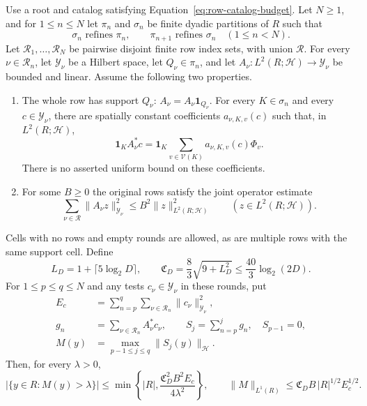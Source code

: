 \begin{lemma}
\label{lem:row-maximal}
Use a root and catalog satisfying
Equation~\eqref{eq:row-catalog-budget}.  Let $N\ge1$, and for
$1\le n\le N$ let $\pi_n$ and $\sigma_n$ be finite dyadic partitions
of $R$ such that
\[
 \sigma_n\text{ refines }\pi_n,\qquad
 \pi_{n+1}\text{ refines }\sigma_n\quad(1\le n<N).
\]
Let $\mathcal R_1,\ldots,\mathcal R_N$ be pairwise disjoint finite
row index sets, with union $\mathcal R$.  For every
$\nu\in\mathcal R_n$, let $\mathcal Y_\nu$ be a Hilbert space,
let $Q_\nu\in\pi_n$, and let
$A_\nu:L^2(R;\mathcal H)\to\mathcal Y_\nu$ be bounded and linear.
Assume the following two properties.
\begin{enumerate}
\item The whole row has support $Q_\nu$:
      $A_\nu=A_\nu\mathbf1_{Q_\nu}$.  For every $K\in\sigma_n$
      and every $c\in\mathcal Y_\nu$, there are spatially constant
      coefficients $a_{\nu,K,v}(c)$ such that, in $L^2(R;\mathcal H)$,
      \[
       \mathbf1_K A_\nu^*c
       =\mathbf1_K\sum_{v\in\mathcal V(K)}
                        a_{\nu,K,v}(c)\Phi_v.
      \]
      There is no asserted uniform bound on these coefficients.
\item For some $B\ge0$ the original rows satisfy the joint operator
      estimate
      \[
       \sum_{\nu\in\mathcal R}\|A_\nu z\|_{\mathcal Y_\nu}^2
       \le B^2\|z\|_{L^2(R;\mathcal H)}^2
       \qquad(z\in L^2(R;\mathcal H)).
      \]
\end{enumerate}
Cells with no rows and empty rounds are allowed, as are multiple rows with
the same support cell.  Define
\[
 L_D=1+\lceil5\log_2D\rceil,\qquad
 \mathfrak C_D=\frac83\sqrt{9+L_D^2}
 \le \frac{40}{3}\log_2(2D).
\]
For $1\le p\le q\le N$ and any tests
$c_\nu\in\mathcal Y_\nu$ in these rounds, put
\[
 \begin{split}
 E_c&=\sum_{n=p}^q\sum_{\nu\in\mathcal R_n}\|c_\nu\|_{\mathcal Y_\nu}^2,\\
 g_n&=\sum_{\nu\in\mathcal R_n}A_\nu^*c_\nu,\qquad
 S_j=\sum_{n=p}^j g_n,\quad S_{p-1}=0,\\
 M(y)&=\max_{p-1\le j\le q}\|S_j(y)\|_{\mathcal H}.
 \end{split}
\]
Then, for every $\lambda>0$,
\begin{equation}
 |\{y\in R:M(y)>\lambda\}|
 \le \min\left\{|R|,
       \frac{\mathfrak C_D^2 B^2 E_c}{4\lambda^2}\right\},
 \qquad
 \|M\|_{L^1(R)}
 \le \mathfrak C_D B\,|R|^{1/2}E_c^{1/2}.
 \label{eq:row-maximal}
\end{equation}
\end{lemma}


